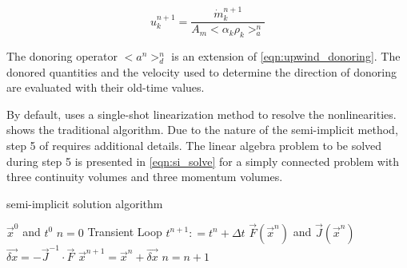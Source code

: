 \begin{equation}
\label{eqn:si_vel}
u^{n+1}_k = \frac{\dot{m}^{n+1}_k}{A_m <\alpha_k \rho_k>^{n}_{a}} 
\end{equation}

The donoring operator $<a^n>^{n}_{d}$ is an extension of \eqref{eqn:upwind_donoring}.
The donored quantities and the velocity used to determine the direction of donoring are evaluated with their old-time values.

By default, \cobra{} uses a single-shot linearization method to resolve the nonlinearities.
 shows the traditional algorithm.
Due to the nature of the semi-implicit method, step 5 of  requires additional details.
The linear algebra problem to be solved during step 5 is presented in \eqref{eqn:si_solve} for a simply connected problem with three continuity volumes and three momentum volumes.

\begin{algo}[H]
\caption{\cobra{} semi-implicit solution algorithm}
\label{alg:si_legacy}
\setlength{\baselineskip}{0.625\baselineskip}
\begin{algorithmic}[1]
\Require $\vec{x}^{0}$ and $t^{0}$
\Set $n = 0$
\Loop \; Transient Loop
    \State $t^{n+1} : = t^{n} + \Delta t$
	\Calculate $\vec{F}(\vec{x}^{n})$ and $\vec{J}(\vec{x}^{n})$
	\BlackBox $\vec{\delta x} = - \vec{J}^{-1}\cdot\vec{F}$
	\Calculate $\vec{x}^{n+1} = \vec{x}^{n} + \vec{\delta x}$
	\State $n = n + 1$
\EndLoop
\end{algorithmic}
\end{algo}


